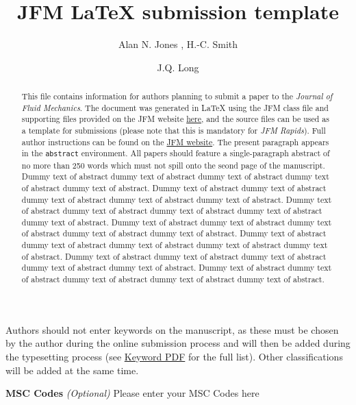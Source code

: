 \documentclass[lineno]{jfm}
\title{JFM {\LaTeX} submission template}
\author{Alan N. Jones\aff{1}
  \corresp{\email{JFMEditorial@cambridge.org}},
  H.-C. Smith\aff{1}
 \and J.Q. Long\aff{2}}
\affiliation{\aff{1}STM Journals, Cambridge University Press, The Printing House, Shaftesbury Road, Cambridge CB2 8BS, UK
\aff{2}DAMTP, Centre for Mathematical Sciences, Wilberforce Road, Cambridge CB3 0WA, UK}
\begin{document}
\maketitle

\begin{abstract}
This file contains information for authors planning to submit a paper to the {\it Journal of Fluid Mechanics}. The document was generated in {\LaTeX} using the JFM class file and supporting files provided on the JFM website \href{https://www.cambridge.org/core/journals/journal-of-fluid-mechanics/information/author-instructions/preparing-your-materials}{here}, and the source files can be used as a template for submissions (please note that this is mandatory for {\it JFM Rapids}). Full author instructions can be found on the \href{https://www.cambridge.org/core/journals/journal-of-fluid-mechanics/information/author-instructions}{JFM website}. The present paragraph appears in the \verb}abstract} environment. All papers should feature a single-paragraph abstract of no more than 250 words which must not spill onto the seond page of the manuscript. Dummy text of abstract dummy text of abstract dummy text of abstract dummy text of abstract dummy text of abstract. Dummy text of abstract dummy text of abstract dummy text of abstract dummy text of abstract dummy text of abstract. Dummy text of abstract dummy text of abstract dummy text of abstract dummy text of abstract dummy text of abstract. Dummy text of abstract dummy text of abstract dummy text of abstract dummy text of abstract dummy text of abstract. Dummy text of abstract dummy text of abstract dummy text of abstract dummy text of abstract dummy text of abstract. Dummy text of abstract dummy text of abstract dummy text of abstract dummy text of abstract dummy text of abstract. Dummy text of abstract dummy text of abstract dummy text of abstract dummy text of abstract dummy text of abstract.
\end{abstract}

\begin{keywords}
Authors should not enter keywords on the manuscript, as these must be chosen by the author during the online submission process and will then be added during the typesetting process (see \href{https://www.cambridge.org/core/journals/journal-of-fluid-mechanics/information/list-of-keywords}{Keyword PDF} for the full list).  Other classifications will be added at the same time.
\end{keywords}

{\bf MSC Codes }  {\it(Optional)} Please enter your MSC Codes here
\end{document}
